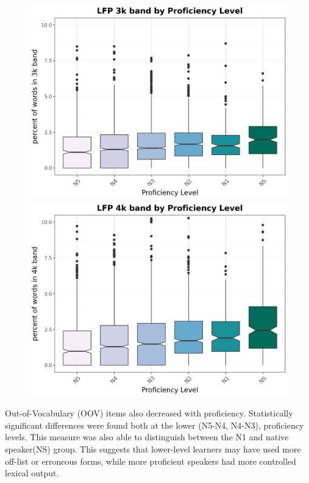 \begin{figure}[htbp]
    \centering
    \begin{minipage}{.48\textwidth}
        \centering
    \includegraphics[scale=.4]{img/LFP/3k}
    \caption[Percentage of tokens used from 3k band]{}
        \label{fig:3kband}
    \end{minipage}
    \hfill
\begin{minipage}{.48\textwidth}
        \centering
        \includegraphics[scale=.4]{img/LFP/4k}
        \caption[Percentage of tokens used from 4k band]{}
\label{fig:4kband}
\end{minipage}
    \end{figure}

Out-of-Vocabulary (OOV) items also decreased with proficiency. Statistically significant
differences were found both at the lower (N5-N4,
N4-N3),
 proficiency levels. This measure was also able to distinguish between the N1 and native speaker(NS) group. This
suggests that lower-level learners may have used more off-list or erroneous forms, while more proficient speakers
had more controlled lexical output.



